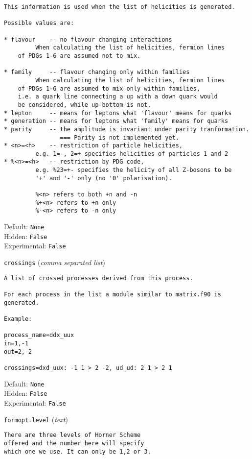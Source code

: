 \begin{basedescript}{\desclabelstyle{\pushlabel}}
\begin{verbatim}
This information is used when the list of helicities is generated.

Possible values are:

* flavour    -- no flavour changing interactions
         When calculating the list of helicities, fermion lines
    of PDGs 1-6 are assumed not to mix.

* family     -- flavour changing only within families
         When calculating the list of helicities, fermion lines
    of PDGs 1-6 are assumed to mix only within families,
    i.e. a quark line connecting a up with a down quark would
    be considered, while up-bottom is not.
* lepton     -- means for leptons what 'flavour' means for quarks
* generation -- means for leptons what 'family' means for quarks
* parity     -- the amplitude is invariant under parity tranformation.
                === Parity is not implemented yet.
* <n>=<h>    -- restriction of particle helicities,
         e.g. 1=-, 2=+ specifies helicities of particles 1 and 2
* %<n>=<h>   -- restriction by PDG code,
         e.g. %23=+- specifies the helicity of all Z-bosons to be
         '+' and '-' only (no '0' polarisation).

         %<n> refers to both +n and -n
         %+<n> refers to +n only
         %-<n> refers to -n only
\end{verbatim}
Default: \verb|None|
\\Hidden: \verb|False|
\\Experimental: \verb|False|
\\\item[\colorbox{gray!30}{\texttt{crossings}}] (\textit{comma separated list})
\begin{verbatim}
A list of crossed processes derived from this process.

For each process in the list a module similar to matrix.f90 is
generated.

Example:

process_name=ddx_uux
in=1,-1
out=2,-2

crossings=dxd_uux: -1 1 > 2 -2, ud_ud: 2 1 > 2 1
\end{verbatim}
Default: \verb|None|
\\Hidden: \verb|False|
\\Experimental: \verb|False|
\\\item[\colorbox{gray!30}{\texttt{formopt.level}}] (\textit{text})
\begin{verbatim}
There are three levels of Horner Scheme
offered and the number here will specify
which one we use. It can only be 1,2 or 3.


\end{verbatim}
\end{basedescript}
